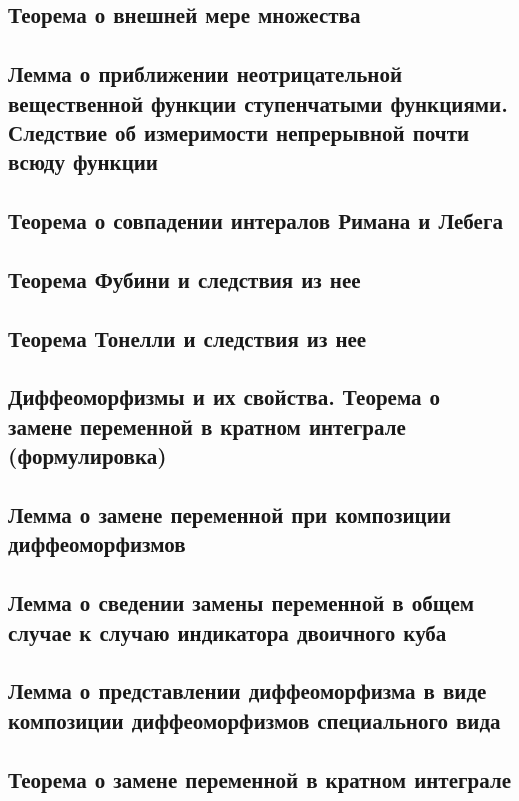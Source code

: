 \documentclass[a4paper]{article}
\theoremstyle{definition}
\theoremstyle{remark}
\begin{document}
    \subsection{ Теорема о внешней мере множества}
    \subsection{ Лемма о приближении неотрицательной вещественной функции ступенчатыми функциями. Следствие об измеримости непрерывной почти всюду функции}
    \subsection{ Теорема о совпадении интералов Римана и Лебега}
    \subsection{ Теорема Фубини и следствия из нее}
    \subsection{ Теорема Тонелли и следствия из нее}
    \subsection{ Диффеоморфизмы и их свойства. Теорема о замене переменной в кратном интеграле (формулировка)}
    \subsection{ Лемма о замене переменной при композиции диффеоморфизмов}
    \subsection{ Лемма о сведении замены переменной в общем случае к случаю индикатора двоичного куба}
    \subsection{ Лемма о представлении диффеоморфизма в виде композиции диффеоморфизмов специального вида}
    \subsection{ Теорема о замене переменной в кратном интеграле}
    
\end{document}
